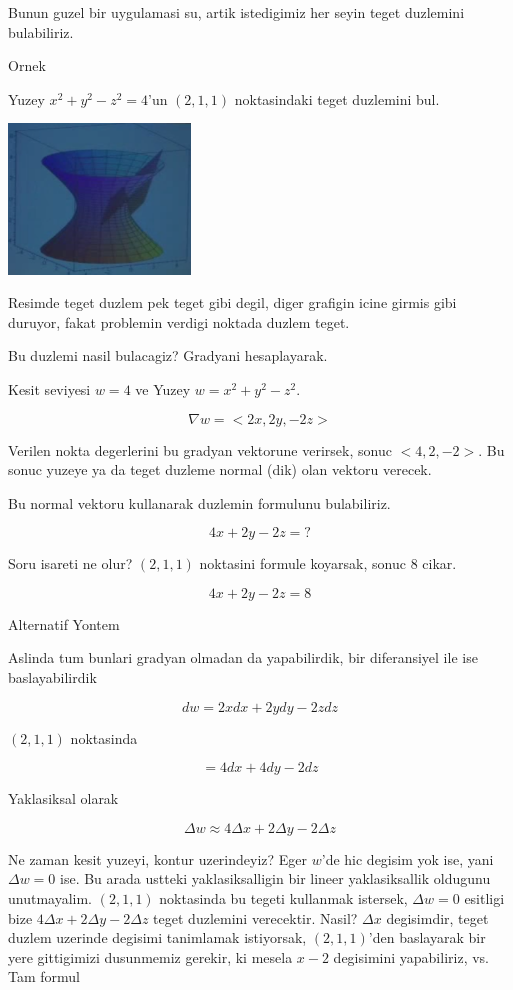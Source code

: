 \documentclass[12pt,fleqn]{article}
\begin{document}
Bunun guzel bir uygulamasi su, artik istedigimiz her seyin teget duzlemini
bulabiliriz. 

Ornek

Yuzey $x^2 + y^2 - z^2 = 4$'un $(2,1,1)$ noktasindaki teget duzlemini bul. 

\includegraphics[height=4cm]{12_5.png}

Resimde teget duzlem pek teget gibi degil, diger grafigin icine girmis gibi
duruyor, fakat problemin verdigi noktada duzlem teget. 

Bu duzlemi nasil bulacagiz? Gradyani hesaplayarak. 

Kesit seviyesi $w=4$ ve Yuzey $w = x^2 + y^2 - z^2$. 

\[ \nabla w = <2x, 2y, -2z> \]

Verilen nokta degerlerini bu gradyan vektorune verirsek, sonuc
$<4,2,-2>$. Bu sonuc yuzeye ya da teget duzleme normal (dik) olan 
vektoru verecek. 

Bu normal vektoru kullanarak duzlemin formulunu bulabiliriz. 

\[ 4x + 2y - 2z = ? \]

Soru isareti ne olur? $(2,1,1)$ noktasini formule koyarsak, sonuc 8 cikar.

\[ 4x + 2y - 2z = 8 \]

Alternatif Yontem

Aslinda tum bunlari gradyan olmadan da yapabilirdik, bir diferansiyel ile
ise baslayabilirdik

\[ dw = 2x dx + 2y dy -2z dz \]

$(2,1,1)$ noktasinda

\[ = 4dx + 4dy - 2dz \]

Yaklasiksal olarak 

\[ \Delta w \approx 4 \Delta x + 2\Delta y - 2\Delta z  \]

Ne zaman kesit yuzeyi, kontur uzerindeyiz? Eger $w$'de hic degisim yok ise,
yani $\Delta w = 0$ ise. Bu arada ustteki yaklasiksalligin bir lineer
yaklasiksallik oldugunu unutmayalim. $(2,1,1)$ noktasinda bu tegeti
kullanmak istersek,  $\Delta w = 0$ esitligi bize $4 \Delta x + 2\Delta y -
2\Delta z $ 
teget duzlemini verecektir. Nasil? $\Delta x$ degisimdir, teget duzlem
uzerinde degisimi tanimlamak istiyorsak, $(2,1,1)$'den baslayarak bir yere
gittigimizi dusunmemiz gerekir, ki mesela $x-2$ degisimini yapabiliriz,
vs. Tam formul
\end{document}
